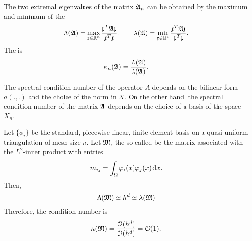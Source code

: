 \begin{definition}
  The two extremal eigenvalues of the matrix $\mathfrak{A}_n$ can be
  obtained by the maximum and minimum of the 
  \begin{gather}
    \label{eq:itintro:3}
    \Lambda(\mathfrak{A}) = \max_{\mathfrak{x}\in \mathbb R^n}\frac{\mathfrak{x}^T \mathfrak{A} \mathfrak{x}}{\mathfrak{x}^T\mathfrak{x}},
    \qquad
    \lambda(\mathfrak{A}) = \min_{\mathfrak{x}\in \mathbb R^n}\frac{\mathfrak{x}^T \mathfrak{A} \mathfrak{x}}{\mathfrak{x}^T\mathfrak{x}}.
  \end{gather}
  The  is
  \begin{gather*}
    \kappa_n(\mathfrak{A}) = \frac{\Lambda(\mathfrak{A})}{\lambda(\mathfrak{A})}.
  \end{gather*}
\end{definition}

\begin{note}
  The spectral condition number of the operator $A$ depends on the
  bilinear form $a(.,.)$ and the choice of the norm in $X$. On the
  other hand, the spectral condition number of the matrix $\mathfrak{A}$
  depends on the choice of a basis of the space $X_n$.
\end{note}

\begin{lemma}
  \label{lemma:itintro:1}
  Let $\{\phi_i\}$ be the standard, piecewise linear, finite element
  basis on a quasi-uniform triangulation of mesh size $h$. Let $\mathfrak{M}$, the so called  be the matrix associated with
  the $L^2$-inner product with entries
  \begin{gather*}
    m_{ij} = \int_\Omega \varphi_i(x) \varphi_j(x) \,\mathrm{d} x.
  \end{gather*}
  Then,
  \begin{gather*}
    \Lambda(\mathfrak{M}) \simeq h^{d} \simeq  \lambda(\mathfrak{M})
  \end{gather*}
  Therefore, the condition number is
  \begin{gather*}
    \kappa(\mathfrak{M}) = \frac{\mathcal O(h^{d})}{\mathcal O(h^{d})} = {\mathcal O(1)}.
  \end{gather*}
\end{lemma}

